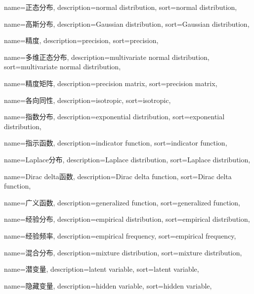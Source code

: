 {
  name=正态分布,
  description={normal distribution},
  sort={normal distribution},
}

{
  name=高斯分布,
  description={Gaussian distribution},
  sort={Gaussian distribution},
}

{
  name=精度,
  description={precision},
  sort={precision},
}

{
  name=多维正态分布,
  description={multivariate normal distribution},
  sort={multivariate normal distribution},
}

{
  name=精度矩阵,
  description={precision matrix},
  sort={precision matrix},
}

{
  name=各向同性,
  description={isotropic},
  sort={isotropic},
}

{
  name=指数分布,
  description={exponential distribution},
  sort={exponential distribution},
}

{
  name=指示函数,
  description={indicator function},
  sort={indicator function},
}

{
  name=Laplace分布,
  description={Laplace distribution},
  sort={Laplace distribution},
}

{
  name=Dirac delta函数,
  description={Dirac delta function},
  sort={Dirac delta function},
}

{
  name=广义函数,
  description={generalized function},
  sort={generalized function},
}

{
  name=经验分布,
  description={empirical distribution},
  sort={empirical distribution},
}

{
  name=经验频率,
  description={empirical frequency},
  sort={empirical frequency},
}

{
  name=混合分布,
  description={mixture distribution},
  sort={mixture distribution},
}

{
  name=潜变量,
  description={latent variable},
  sort={latent variable},
}

{
  name=隐藏变量,
  description={hidden variable},
  sort={hidden variable},
}

